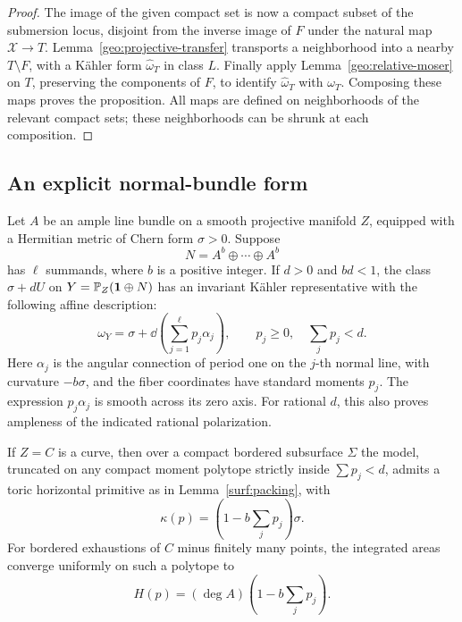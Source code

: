 \begin{proof}
The image of the given compact set is now a compact subset of the
submersion locus, disjoint from the inverse image of \(F\) under
the natural map \(\mathcal X\to T\).
Lemma~\ref{geo:projective-transfer} transports a neighborhood into
a nearby \(T\setminus F\), with a K\"ahler form
\(\widehat\omega_T\) in class \(L\).
Finally apply Lemma~\ref{geo:relative-moser} on \(T\), preserving
the components of \(F\), to identify \(\widehat\omega_T\) with
\(\omega_T\). Composing these maps proves the proposition.
All maps are defined on neighborhoods of the relevant compact
sets; these neighborhoods can be shrunk at each composition.
\end{proof}

\subsection{An explicit normal-bundle form}

\begin{lemma}\label{geo:bundle}
Let \(A\) be an ample line bundle on a smooth projective manifold
\(Z\), equipped with a Hermitian metric of Chern form
\(\sigma>0\). Suppose
\[
 N=A^b\oplus\cdots\oplus A^b
\]
has \(\ell\) summands, where \(b\) is a positive integer.
If \(d>0\) and \(bd<1\), the class
\(\sigma+dU\) on \(Y=\mathbb P_Z(\mathbf1\oplus N)\) has an invariant
K\"ahler representative with the following affine description:
\begin{equation}\label{geo:bundle-form}
 \omega_Y=\sigma+\dd\left(\sum_{j=1}^{\ell}p_j\alpha_j\right),
 \qquad p_j\ge0,\quad \sum_jp_j<d.
\end{equation}
Here \(\alpha_j\) is the angular connection of period one on the
\(j\)-th normal line, with curvature \(-b\sigma\), and the fiber
coordinates have standard moments \(p_j\).
The expression \(p_j\alpha_j\) is smooth across its zero axis.
For rational \(d\), this also proves ampleness of the indicated
rational polarization.

If \(Z=C\) is a curve, then over a compact bordered subsurface
\(\Sigma\) the model, truncated on any compact moment polytope
strictly inside \(\sum p_j<d\), admits a toric horizontal primitive
as in Lemma~\ref{surf:packing}, with
\[
 \kappa(p)=\left(1-b\sum_jp_j\right)\sigma.
\]
For bordered exhaustions of \(C\) minus finitely many points, the
integrated areas converge uniformly on such a polytope to
\[
 H(p)=(\deg A)\left(1-b\sum_jp_j\right).
\]
\end{lemma}

